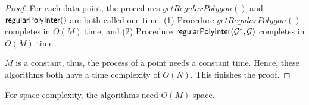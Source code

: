 \begin{proof}
For each data point, the procedures $getRegularPolygon()$ and ${\mathsf{regularPolyInter}}()$ are both called one time.
(1) Procedure $getRegularPolygon()$ completes in $O(M)$ time, and
(2) Procedure ${\mathsf{regularPolyInter}}(\mathcal{G}^*, \mathcal{G})$ completes in $O(M)$ time.

$M$ is a constant, thus, the process of a point needs a constant time. Hence, these algorithms both have a time complexity of $O(N)$.
This finishes the proof.
\end{proof}


{For space complexity, the algorithms need $O(M)$ space.}
